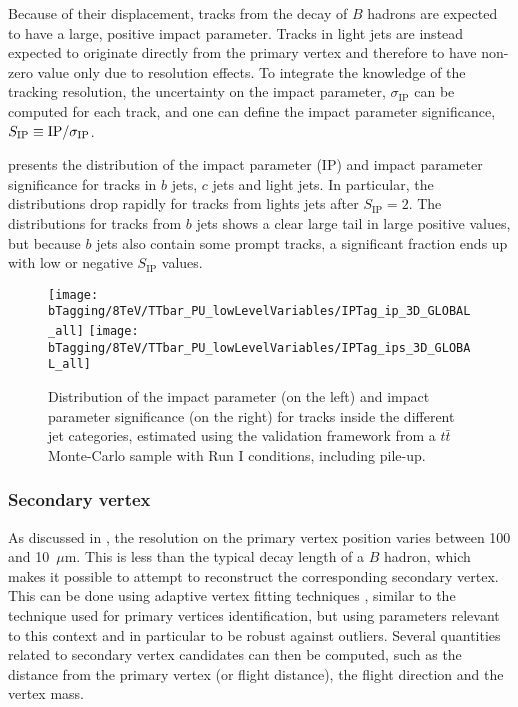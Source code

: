     Because of their displacement, tracks from the decay of $B$ hadrons are expected to
    have a large, positive impact parameter. Tracks in light jets are instead expected
    to originate directly from the primary vertex and therefore to have non-zero value
    only due to resolution effects. To integrate the knowledge of the tracking resolution,
    the uncertainty on the impact parameter, $\sigma_\text{IP}$ can be computed for each
    track, and one can define the impact parameter significance, $S_\text{IP} \equiv
    \text{IP}/\sigma_\text{IP}$.

     presents the distribution of the
    impact parameter (IP) and impact parameter significance for tracks in $b$ jets, $c$
    jets and light jets. In particular, the distributions drop rapidly for tracks from
    lights jets after $S_\text{IP} = 2$. The distributions for tracks from $b$ jets shows
    a clear large tail in large positive values, but because $b$ jets also contain some
    prompt tracks, a significant fraction ends up with low or negative $S_\text{IP}$
    values.

    \begin{figure}[th!]
        \centering
        \begin{minipage}{\textwidth}
        \texttt{[image: bTagging/8TeV/TTbar\_PU\_lowLevelVariables/IPTag\_ip\_3D\_GLOBAL\_all]}
        \texttt{[image: bTagging/8TeV/TTbar\_PU\_lowLevelVariables/IPTag\_ips\_3D\_GLOBAL\_all]}
        \end{minipage}
        \caption{Distribution of the impact parameter (on the left) and impact parameter significance
        (on the right) for tracks
        inside the different jet categories, estimated using the validation framework from a
        $t\bar{t}$ Monte-Carlo sample with Run I conditions, including pile-up.}
        \label{fig:bTagging/impactParameterDistr}
    \end{figure}

    \subsubsection{Secondary vertex}

    As discussed in , the resolution on the primary
    vertex position varies between 100 and 10~$\mu$m. This is less than the typical decay length
    of a $B$ hadron, which makes it possible to attempt to reconstruct the corresponding
    secondary vertex. This can be done using adaptive vertex fitting techniques \cite{AdaptiveVertexFitting},
    similar to the technique used for primary vertices identification, but using parameters
    relevant to this context and in particular to be robust against outliers. Several
    quantities related to secondary vertex candidates can then be computed, such as the
    distance from the primary vertex (or flight distance), the flight direction and the
    vertex mass.

